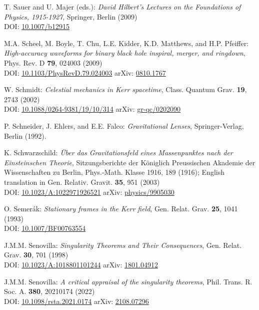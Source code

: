\begin{thebibliography}{123}
T. Sauer and U. Majer (eds.):
{\em David Hilbert’s Lectures on the Foundations of Physics, 1915-1927},
Springer, Berlin (2009)\\
DOI: \href{https://doi.org/10.1007/b12915}{10.1007/b12915}

M.A. Scheel, M. Boyle, T. Chu, L.E. Kidder, K.D. Matthews, and H.P. Pfeiffer:
{\em High-accuracy waveforms for binary black hole inspiral, merger, and ringdown},
Phys. Rev. D {\bf 79}, 024003 (2009)\\
DOI: \href{https://doi.org/10.1103/PhysRevD.79.024003}{10.1103/PhysRevD.79.024003}\hfill
arXiv: \href{https://arxiv.org/abs/0810.1767}{0810.1767}

W. Schmidt:
{\em Celestial mechanics in Kerr spacetime},
Class. Quantum Grav. {\bf 19}, 2743 (2002)\\
DOI: \href{https://doi.org/10.1088/0264-9381/19/10/314}{10.1088/0264-9381/19/10/314}\hfill
arXiv: \href{https://arxiv.org/abs/gr-qc/0202090}{gr-qc/0202090}

P. Schneider, J. Ehlers, and E.E. Falco:
{\em Gravitational Lenses},
Springer-Verlag, Berlin (1992).

K. Schwarzschild:
{\em \"Uber das Gravitationsfeld eines Massenpunktes nach der Einsteinschen Theorie},
Sitzungsberichte der K\"oniglich Preussischen Akademie der Wissenschaften zu Berlin, Phys.-Math. Klasse 1916, 189 (1916);
English translation in Gen. Relativ. Gravit. {\bf 35}, 951 (2003)\\
DOI: \href{https://doi.org/10.1023/A:1022971926521}{10.1023/A:1022971926521}\hfill
arXiv: \href{https://arxiv.org/abs/physics/9905030}{physics/9905030}

O. Semer\'ak:
{\em Stationary frames in the Kerr field},
Gen. Relat. Grav. {\bf 25}, 1041 (1993)\\
DOI: \href{https://doi.org/10.1007/BF00763554}{10.1007/BF00763554}

J.M.M. Senovilla:
{\em Singularity Theorems and Their Consequences},
Gen. Relat. Grav. {\bf 30}, 701 (1998)\\
DOI: \href{https://doi.org/10.1023/A:1018801101244}{10.1023/A:1018801101244}\hfill
arXiv: \href{https://arxiv.org/abs/1801.04912}{1801.04912}

J.M.M. Senovilla:
{\em A critical appraisal of the singularity theorems},
Phil. Trans. R. Soc. A. {\bf 380}, 20210174 (2022)\\
DOI: \href{https://doi.org/10.1098/rsta.2021.0174}{10.1098/rsta.2021.0174}\hfill
arXiv: \href{https://arxiv.org/abs/2108.07296}{2108.07296}


\end{thebibliography}
